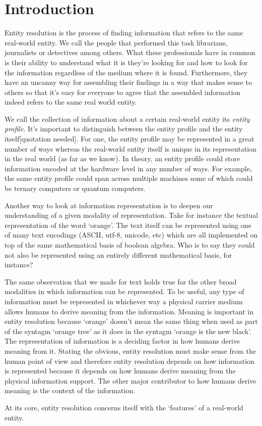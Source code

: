 \documentclass[a4paper,12pt]{article}
\begin{document}
\section{Introduction}

Entity resolution is the process of finding information that refers to the same
real-world entity. We call the people that performed this task librarians,
journalists or detectives among others. What these professionals have in
common is their ability to understand what it is they're looking for and how to
look for the information regardless of the medium where it is found.
Furthermore, they have an uncanny way for assembling their findings in a way
that makes sense to others so that it's easy for everyone to agree that the
assembled information indeed refers to the same real world entity.

We call the collection of information about a certain real-world entity its
\textit{entity profile}. It's important to distinguish between the entity
profile and the entity itself[quotation needed]. For one, the entity profile may
be represented in a great number of ways whereas the real-world entity itself is
unique in its representation in the real world (as far as we know). In theory,
an entity profile could store information encoded at the hardware level in any
number of ways. For example, the same entity profile could span across multiple
machines some of which could be ternary computers or quantum computers.

Another way to look at information representation is to deepen our understanding of a given
modality of representation. Take for instance the textual representation of the
word `orange'. The text itself can be represented using one of many text
encodings (ASCII, utf-8, unicode, etc) which are all implemented on top of the
same mathematical basis of boolean algebra. Who is to say they could not also be
represented using an entirely different mathematical basis, for instance?

The same observation that we made for text holds true for the other broad
modalities in which information can be represented. To be useful, any type of
information must be represented in whichever way a physical carrier medium
allows humans to derive meaning from the information. Meaning is important in
entity resolution because `orange' doesn't mean the same thing when used as
part of the syntagm `orange tree' as it does in the syntagm `orange is the new
black'. The representation of information is a deciding factor in how humans
derive meaning from it. Stating the obvious, entity resolution must make sense
from the human point of view and therefore entity resolution depends on how
information is represented because it depends on how humans derive meaning from
the physical information support. The other major contributor to how humans
derive meaning is the context of the information.

At its core, entity resolution concerns itself with the `features' of a
real-world entity.
\end{document}
